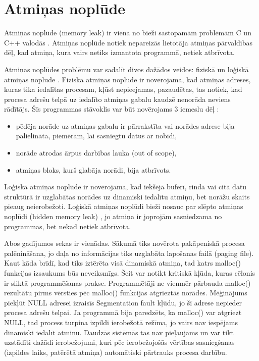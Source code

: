 ﻿\section{Atmiņas noplūde}


Atmiņas noplūde (memory leak) ir viena no bieži sastopamām problēmām C un C++ valodās \cite{atparv}.
Atmiņas noplūde notiek nepareizās lietotāja atmiņas pārvaldības dēļ, kad atmiņa, kura vairs netiks izmantota programmā, netiek atbrīvota.

Atmiņas noplūdes problēmu var sadalīt divos dažādos veidos: fiziskā un loģiskā atmiņas noplūde \cite{JMMR}.
Fiziskā atmiņas noplūde ir novērojama, kad atmiņas adreses, kuras tika iedalītas procesam,  kļūst nepieejamas, pazaudētas, tas notiek, kad procesa adrešu telpā uz iedalīto atmiņas gabalu kaudzē nenorāda neviens rādītājs.
Šīs programmas stāvoklis var būt novērojams 3 iemeslu dēļ \cite{JMMR}:
\begin{itemize}
\item pēdēja norāde uz atmiņas gabalu ir pārrakstīta vai norādes adrese bija palielināta, piemēram, lai sasniegtu datus ar nobīdi,
\item norāde atrodas ārpus darbības lauka (out of scope),
\item atmiņas bloks, kurš glabāja norādi, bija atbrīvots.
\end{itemize}

Loģiskā atmiņas noplūde ir novērojama, kad iekšējā buferī, rindā vai citā datu struktūrā ir uzglabātas norādes uz dinamiski iedalītu atmiņu, bet norāžu skaits pieaug neierobežoti.
Loģiskā atmiņas noplūdi bieži nosauc par slēpto atmiņas noplūdi (hidden memory leak) \cite{RRUU}, jo atmiņa ir joprojām sasniedzama no programmas, bet nekad netiek atbrīvota.

Abos gadījumos sekas ir vienādas.
Sākumā tiks novērota pakāpeniskā procesa palēnināšana, jo daļa no informācijas tiks uzglabāta lapošanas failā (paging file).
Kaut kāda brīdī, kad tiks iztērēta visā dinamiskā atmiņa, tad katrs malloc() funkcijas izsaukums būs neveiksmīgs.
Šeit var notikt kritiskā kļūda, kuras cēlonis ir sliktā programmēšanas prakse.
Programmētāji ne vienmēr pārbauda malloc() rezultātu pirms vērsties pēc malloc() funkcijas atgrieztās norādes.  
Mēģinājums piekļūt NULL adresei  izraisīs Segmentation fault kļūdu, jo šī adrese nepieder procesa adrešu telpai.
Ja programmā bija paredzēts, ka malloc() var atgriezt NULL, tad process turpina izpildi ierobežotā režīma, jo vairs nav iespējams dinamiski iedalīt atmiņu. 
Daudzās sistēmās tas nav pieļaujams un var tikt uzstādīti dažādi ierobežojumi, kuri pēc ierobežojošās vērtības sasniegšanas (izpildes laiks, patērētā atmiņa) automātiski pārtrauks procesa darbību. 

